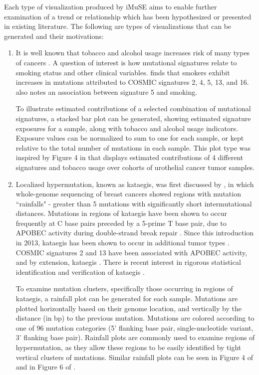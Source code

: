 \documentclass[12pt, letterpaper]{article}
\begin{document}
Each type of visualization produced by iMuSE aims to enable further examination of a trend or relationship which has been hypothesized or presented in existing literature.
The following are types of visualizations that can be generated and their motivations:
\begin{enumerate}
\item It is well known that tobacco and alcohol usage increases risk of many types of cancers \citep{doll1956lung,collaborative2002alcohol}. A question of interest is how mutational signatures relate to smoking status and other clinical variables. \citet{alexandrov2016mutational} finds that smokers exhibit increases in mutations attributed to COSMIC signatures 2, 4, 5, 13, and 16. \citet{kim2016somatic} also notes an association between signature 5 and smoking.

To illustrate estimated contributions of a selected combination of mutational signatures, a stacked bar plot can be generated, showing estimated signature exposures for a sample, along with tobacco and alcohol usage indicators.
Exposure values can be normalized to sum to one for each sample, or kept relative to the total number of mutations in each sample.
This plot type was inspired by Figure 4 in \citet{kim2016somatic} that displays estimated contributions of 4 different signatures and tobacco usage over cohorts of urothelial cancer tumor samples.
    
\item Localized hypermutation, known as kataegis, was first discussed by \citet{taylor2013dna}, in which whole-genome sequencing of breast cancers showed regions with mutation ``rainfalls" - greater than 5 mutations with significantly short intermutational distances. Mutations in regions of kataegis have been shown to occur frequently at C base pairs preceded by a 5-prime T base pair, due to APOBEC activity during double-strand break repair \citep{taylor2013dna,alexandrov2013signatures}. Since this introduction in 2013, kataegis has been shown to occur in additional tumor types \citep{alexandrov2013signatures}. COSMIC signatures 2 and 13 have been associated with APOBEC activity, and by extension, kataegis \citep{alexandrov2013signatures}. There is recent interest in rigorous statistical identification and verification of kataegis \citep{yousif2018origins}.

To examine mutation clusters, specifically those occurring in regions of kataegis, a rainfall plot can be generated for each sample.
Mutations are plotted horizontally based on their genome location, and vertically by the distance (in bp) to the previous mutation.
Mutations are colored according to one of 96 mutation categories (5' flanking base pair, single-nucleotide variant, 3' flanking base pair).
Rainfall plots are commonly used to examine regions of hypermutation, as they allow these regions to be easily identified by tight vertical clusters of mutations. 
Similar rainfall plots can be seen in Figure 4 of \citet{nik2012mutational} and in Figure 6 of \citet{alexandrov2013signatures}.


\end{enumerate}
\end{document}
